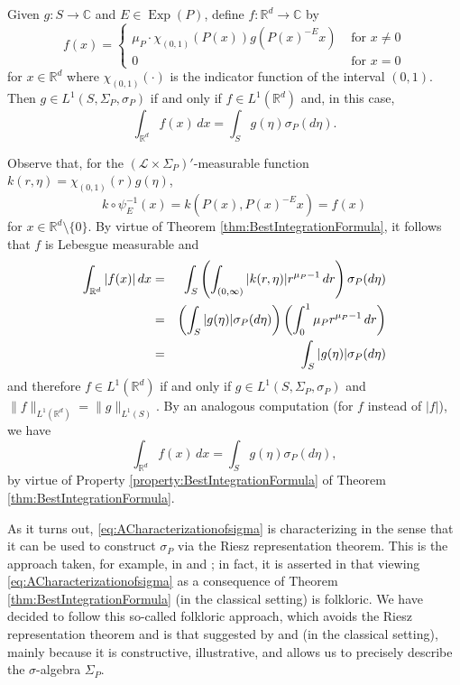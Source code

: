 \documentclass[smallextended]{svjour3}
\theoremstyle{remark}
\renewenvironment{proof}[1][\proofname]{\renewcommand\xproofname{#1}\xproof}{\endxproof}
\newcommand\Exp{\operatorname{Exp}}
\begin{document}
\begin{corollary}\label{cor:IntegrateOnS}
Given $g:S\to\mathbb{C}$ and $E\in\Exp(P)$, define $f:\mathbb{R}^d\to\mathbb{C}$ by
\begin{equation*}
f(x)=\begin{cases}
\mu_P\cdot \chi_{(0,1)}(P(x))g(P(x)^{-E}x) & \mbox{ for }x\neq 0\\
0 & \mbox{ for }x=0
\end{cases}
\end{equation*}
for $x\in\mathbb{R}^d$ where $\chi_{(0,1)}(\cdot)$ is the indicator function of the interval $(0,1)$. Then $g\in L^1(S,\Sigma_P,\sigma_P)$ if and only if $f\in L^1(\mathbb{R}^d)$ and, in this case, 
\begin{equation}\label{eq:ACharacterizationofsigma}
    \int_{\mathbb{R}^d}f(x)\,dx=\int_Sg(\eta)\sigma_P(d\eta).
\end{equation}
\end{corollary}
\begin{proof}
Observe that, for the $(\mathcal{L}\times\Sigma_P)'$-measurable function $k(r,\eta)=\chi_{(0,1)}(r)g(\eta)$,
\begin{equation*}
    k\circ\psi_E^{-1}(x)=k(P(x),P(x)^{-E}x)=f(x)
\end{equation*}
for $x\in\mathbb{R}^d\setminus \{0\}$. By virtue of Theorem \ref{thm:BestIntegrationFormula}, it follows that $f$ is Lebesgue measurable and 
\begin{eqnarray*}
   \int_{\mathbb{R}^d}|f(x)|\,dx&=&\int_{S}\left(\int_{(0,\infty)}|k(r,\eta)|r^{\mu_P-1}\,dr\right)\sigma_P(d\eta)\\
    &=&\left(\int_S|g(\eta)|\sigma_P(d\eta)\right)\left(\int_0^1 \mu_Pr^{\mu_P-1}\,dr\right)\\
    &=&\int_S\abs{g(\eta)}\sigma_P(d\eta)
\end{eqnarray*}
and therefore $f\in L^1(\mathbb{R}^d)$ if and only if $g\in L^1(S,\Sigma_P,\sigma_P)$ and $\|f\|_{L^1(\mathbb{R}^d)}=\|g\|_{L^1(S)}$. By an analogous computation (for $f$ instead of $|f|$), we have
\begin{equation*}
    \int_{\mathbb{R}^d}f(x)\,dx=\int_S g(\eta)\sigma_P(d\eta),
\end{equation*}
by virtue of Property \ref{property:BestIntegrationFormula} of Theorem \ref{thm:BestIntegrationFormula}. 
\end{proof}

\noindent As it turns out, \eqref{eq:ACharacterizationofsigma} is characterizing in the sense that it can be used to construct $\sigma_P$ via the Riesz representation theorem. This is the approach taken, for example, in \cite{folland_hardy_1982} and \cite{baker_integration_1997}; in fact, it is asserted in \cite{baker_integration_1997} that viewing \eqref{eq:ACharacterizationofsigma} as a consequence of Theorem \ref{thm:BestIntegrationFormula} (in the classical setting) is folkloric. We have decided to follow this so-called folkloric approach, which avoids the Riesz representation theorem and is that suggested by \cite{rudin_real_1987} and \cite{folland_how_2001} (in the classical setting), mainly because it is constructive, illustrative, and allows us to precisely describe the $\sigma$-algebra $\Sigma_P$.\\
\end{document}
